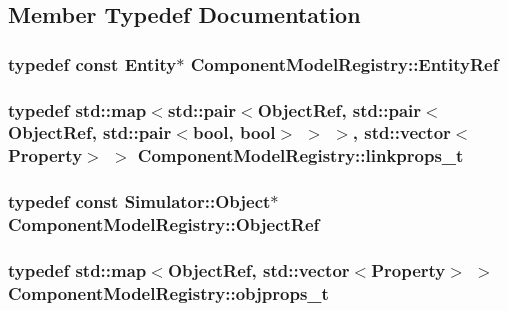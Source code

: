\subsection{Member Typedef Documentation}
\hypertarget{class_component_model_registry_ad5fd4e46e4b78c737db070735c2ffb16}{
\subsubsection[{Entity\+Ref}]{\setlength{\rightskip}{0pt plus 5cm}typedef const {\bf Entity}$\ast$ {\bf Component\+Model\+Registry\+::\+Entity\+Ref}\hspace{0.3cm}{\ttfamily [protected]}}}\label{class_component_model_registry_ad5fd4e46e4b78c737db070735c2ffb16}
\hypertarget{class_component_model_registry_a05e8f9171449fb800c90abee1a698afb}{
\subsubsection[{linkprops\+\_\+t}]{\setlength{\rightskip}{0pt plus 5cm}typedef std\+::map$<$std\+::pair$<${\bf Object\+Ref}, std\+::pair$<${\bf Object\+Ref}, std\+::pair$<$bool, bool$>$ $>$ $>$, std\+::vector$<${\bf Property}$>$ $>$ {\bf Component\+Model\+Registry\+::linkprops\+\_\+t}\hspace{0.3cm}{\ttfamily [protected]}}}\label{class_component_model_registry_a05e8f9171449fb800c90abee1a698afb}
\hypertarget{class_component_model_registry_a315c966cec3143524c002daa7301b054}{
\subsubsection[{Object\+Ref}]{\setlength{\rightskip}{0pt plus 5cm}typedef const {\bf Simulator\+::\+Object}$\ast$ {\bf Component\+Model\+Registry\+::\+Object\+Ref}\hspace{0.3cm}{\ttfamily [protected]}}}\label{class_component_model_registry_a315c966cec3143524c002daa7301b054}
\hypertarget{class_component_model_registry_af0083198a2d84ecf7d7d668e5b3e4660}{
\subsubsection[{objprops\+\_\+t}]{\setlength{\rightskip}{0pt plus 5cm}typedef std\+::map$<${\bf Object\+Ref}, std\+::vector$<${\bf Property}$>$ $>$ {\bf Component\+Model\+Registry\+::objprops\+\_\+t}\hspace{0.3cm}{\ttfamily [protected]}}}\label{class_component_model_registry_af0083198a2d84ecf7d7d668e5b3e4660}
